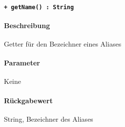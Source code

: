 \paragraph{\texttt{+ getName() : String}}\label{AP_Alias_getName}%
\paragraph*{Beschreibung}
Getter für den Bezeichner eines Aliases
\paragraph*{Parameter}
Keine
\paragraph*{Rückgabewert}
String, Bezeichner des Aliases
